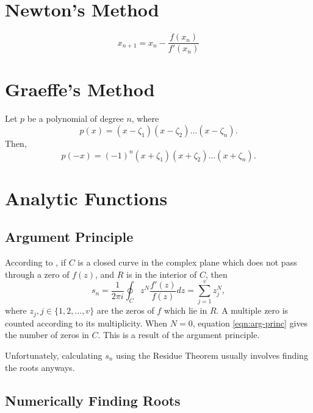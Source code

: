 \documentclass{article}
\begin{document}
\section{Newton's Method}

\begin{equation}
	x_{n+1}=x_n-\frac{f(x_n)}{f'(x_n)}
\end{equation}

\section{Graeffe's Method}

Let $p$ be a polynomial of degree $n$, where 
\[p(x)=(x-\zeta_1)(x-\zeta_2)\dots(x-\zeta_n).\]
Then,
\[p(-x)=(-1)^n(x+\zeta_1)(x+\zeta_2)\dots(x+\zeta_n).\]

\section{Analytic Functions}

\subsection{Argument Principle}

According to \cite{delves1967numerical},
if $C$ is a closed curve in the complex plane which does not pass through a zero of $f(z)$, and $R$ is in the interior of $C$, 
then
\begin{equation}\label{eqn:arg-princ}
	s_n=\frac{1}{2\pi i}\oint_Cz^N\frac{f'(z)}{f(z)}dz=\sum_{j=1}^vz_j^N,
\end{equation}
where $z_j,j\in\{1,2,\dots,v\}$ are the zeros of $f$ which lie in $R$.
A multiple zero is counted according to its multiplicity.
When $N=0$, equation \ref{eqn:arg-princ} gives the number of zeros in $C$.
This is a result of the argument principle.\cite{wiki:argument-principle}

Unfortunately, calculating $s_n$ using the Residue Theorem usually involves finding the roots anyways.

\subsection{Numerically Finding Roots}
\end{document}
